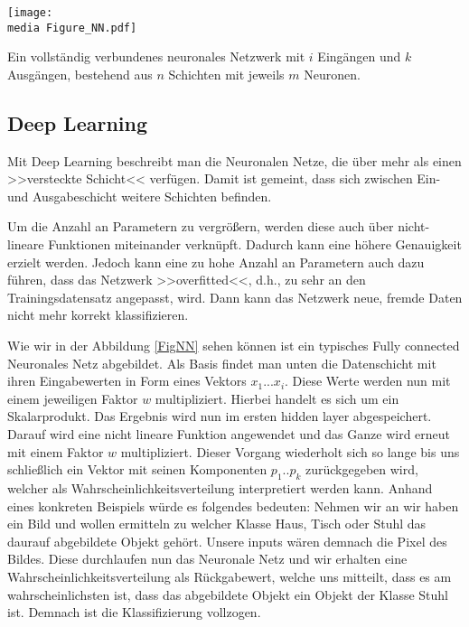 \begin{dsafigure}
	\begin{center}
		\texttt{[image: \\media Figure\_NN.pdf]}
		\caption{Ein vollständig verbundenes neuronales Netzwerk mit $i$ Eingängen und $k$ Ausgängen, bestehend aus $n$ Schichten mit jeweils $m$ \glqq Neuronen\grqq .}
		\label{FigNN}
	\end{center}
\end{dsafigure}

\subsection{Deep Learning}

Mit Deep Learning beschreibt man die Neuronalen Netze, die über mehr als einen >>versteckte Schicht<< verfügen. Damit ist gemeint, dass sich zwischen Ein- und Ausgabeschicht weitere Schichten befinden. 

Um die Anzahl an Parametern zu vergrößern, werden diese auch über nicht-lineare Funktionen miteinander verknüpft. Dadurch kann eine höhere Genauigkeit erzielt werden. Jedoch kann eine zu hohe Anzahl an Parametern auch dazu führen, dass das Netzwerk >>overfitted<<, d.h., zu sehr an den Trainingsdatensatz angepasst, wird. Dann kann das Netzwerk neue, fremde Daten nicht mehr korrekt klassifizieren. 

Wie wir in der Abbildung \ref{FigNN} sehen können ist ein typisches Fully connected Neuronales Netz abgebildet. Als Basis findet man unten die Datenschicht mit ihren Eingabewerten in Form eines Vektors $x_1 ... x_i$. Diese Werte werden nun mit einem jeweiligen Faktor $w$ multipliziert. Hierbei handelt es sich um ein Skalarprodukt. Das Ergebnis wird nun im ersten hidden layer abgespeichert. Darauf wird eine nicht lineare Funktion angewendet und das Ganze wird erneut mit einem Faktor $w$ multipliziert. Dieser Vorgang wiederholt sich so lange bis uns schließlich ein Vektor mit seinen Komponenten $p_1 .. p_k$ zurückgegeben wird, welcher als Wahrscheinlichkeitsverteilung interpretiert werden kann. Anhand eines konkreten Beispiels würde es folgendes bedeuten:
Nehmen wir an wir haben ein Bild und wollen ermitteln zu welcher Klasse Haus, Tisch oder Stuhl das daurauf abgebildete Objekt gehört. Unsere inputs wären demnach die Pixel des Bildes. Diese durchlaufen nun das Neuronale Netz und wir erhalten eine Wahrscheinlichkeitsverteilung als Rückgabewert, welche uns mitteilt, dass es am wahrscheinlichsten ist, dass das abgebildete Objekt ein Objekt der Klasse Stuhl ist. Demnach ist die Klassifizierung vollzogen.

